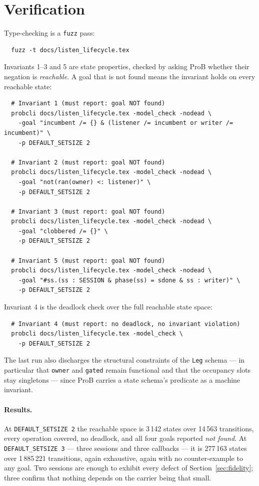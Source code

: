 \documentclass[a4paper,10pt,fleqn]{article}
\begin{document}
\section{Verification}
\label{sec:verify}

Type-checking is a \texttt{fuzz} pass:
\begin{verbatim}
  fuzz -t docs/listen_lifecycle.tex
\end{verbatim}

Invariants 1--3 and 5 are state properties, checked by asking ProB
whether their negation is \emph{reachable}.  A goal that is not found
means the invariant holds on every reachable state:
\begin{verbatim}
  # Invariant 1 (must report: goal NOT found)
  probcli docs/listen_lifecycle.tex -model_check -nodead \
    -goal "incumbent /= {} & (listener /= incumbent or writer /= incumbent)" \
    -p DEFAULT_SETSIZE 2

  # Invariant 2 (must report: goal NOT found)
  probcli docs/listen_lifecycle.tex -model_check -nodead \
    -goal "not(ran(owner) <: listener)" \
    -p DEFAULT_SETSIZE 2

  # Invariant 3 (must report: goal NOT found)
  probcli docs/listen_lifecycle.tex -model_check -nodead \
    -goal "clobbered /= {}" \
    -p DEFAULT_SETSIZE 2

  # Invariant 5 (must report: goal NOT found)
  probcli docs/listen_lifecycle.tex -model_check -nodead \
    -goal "#ss.(ss : SESSION & phase(ss) = sdone & ss : writer)" \
    -p DEFAULT_SETSIZE 2
\end{verbatim}

Invariant 4 is the deadlock check over the full reachable state space:
\begin{verbatim}
  # Invariant 4 (must report: no deadlock, no invariant violation)
  probcli docs/listen_lifecycle.tex -model_check \
    -p DEFAULT_SETSIZE 2
\end{verbatim}

The last run also discharges the structural constraints of the
\texttt{Leg} schema --- in particular that \texttt{owner} and
\texttt{gated} remain functional and that the occupancy slots stay
singletons --- since ProB carries a state schema's predicate as a
machine invariant.

\paragraph{Results.}
At \texttt{DEFAULT\_SETSIZE 2} the reachable space is 3\,142 states over
14\,563 transitions, every operation covered, no deadlock, and all four
goals reported \emph{not found}.  At \texttt{DEFAULT\_SETSIZE 3} --- three
sessions and three callbacks --- it is 277\,163 states over 1\,885\,221
transitions, again exhaustive, again with no counter-example to any goal.
Two sessions are enough to exhibit every defect of
Section~\ref{sec:fidelity}; three confirm that nothing depends on the
carrier being that small.
\end{document}
